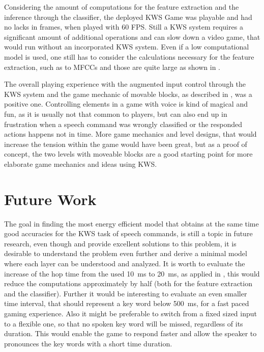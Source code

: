 Considering the amount of computations for the feature extraction and the inference through the classifier, the deployed KWS Game was playable and had no lacks in frames, when played with 60 FPS.
Still a KWS system requires a significant amount of additional operations and can slow down a video game, that would run without an incorporated KWS system.
Even if a low computational model is used, one still has to consider the calculations necessary for the feature extraction, such as to MFCCs and those are quite large as shown in .

The overall playing experience with the augmented input control through the KWS system and the game mechanic of movable blocks, as described in , was a positive one.
Controlling elements in a game with voice is kind of magical and fun, as it is usually not that common to players, but can also end up in frustration when a speech command was wrongly classified or the responded actions happens not in time.
More game mechanics and level designs, that would increase the tension within the game would have been great, but as a proof of concept, the two levels with moveable blocks are a good starting point for more elaborate game mechanics and ideas using KWS.



\section{Future Work}
\thesisStateReady
The goal in finding the most energy efficient model that obtains at the same time good accuracies for the KWS task of speech commands, is still a topic in future research, even though \cite{Zhang2017} and \cite{Peter2020} provide excellent solutions to this problem, it is desirable to understand the problem even further and derive a minimal model where each layer can be understood and analyzed.
It is worth to evaluate the increase of the hop time from the used \SI{10}{\milli\second} to \SI{20}{\milli\second}, as applied in \cite{Peter2020}, this would reduce the computations approximately by half (both for the feature extraction and the classifier).
Further it would be interesting to evaluate an even smaller time interval, that should represent a key word below \SI{500}{\milli\second}, for a fast paced gaming experience.
Also it might be preferable to switch from a fixed sized input to a flexible one, so that no spoken key word will be missed, regardless of its duration.
This would enable the game to respond faster and allow the speaker to pronounces the key words with a short time duration.

